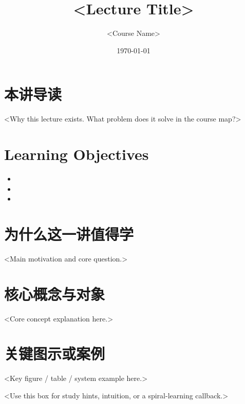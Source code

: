 \documentclass[11pt,a4paper]{article}
\title{<Lecture Title>}
\author{<Course Name>}
\date{\today}
\begin{document}
\maketitle

\section{本讲导读}

<Why this lecture exists. What problem does it solve in the course map?>

\section{Learning Objectives}

\begin{itemize}
  \item <Objective 1>
  \item <Objective 2>
  \item <Objective 3>
\end{itemize}

\section{为什么这一讲值得学}

<Main motivation and core question.>

\section{核心概念与对象}

<Core concept explanation here.>

\section{关键图示或案例}

<Key figure / table / system example here.>

\begin{tipbox}
<Use this box for study hints, intuition, or a spiral-learning callback.>
\end{tipbox}
\end{document}
